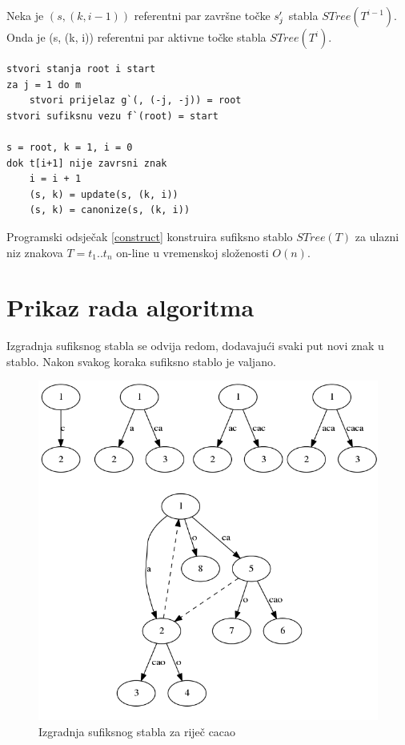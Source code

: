 \documentclass[times, utf8, seminar, numeric]{fer}
\begin{document}
\begin{lema}
Neka je $(s, (k, i-1))$ referentni par završne točke $s_j\rq{}$ stabla $STree(T^{i-1})$. Onda je (s, (k, i)) referentni par aktivne točke stabla $STree(T^i)$.
\end{lema}
			
\begin{lstlisting}[caption=Konstrukcija sufiksnog stabla, label=construct]
stvori stanja root i start
za j = 1 do m
	stvori prijelaz g`(, (-j, -j)) = root
stvori sufiksnu vezu f`(root) = start

s = root, k = 1, i = 0
dok t[i+1] nije zavrsni znak
	i = i + 1
	(s, k) = update(s, (k, i))
	(s, k) = canonize(s, (k, i))
\end{lstlisting}

Programski odsječak \ref{construct} konstruira sufiksno stablo $STree(T)$ za ulazni niz znakova $T = t_1 .. t_n$ on-line u vremenskoj složenosti $O(n)$.
						
\chapter{Prikaz rada algoritma}
Izgradnja sufiksnog stabla se odvija redom, dodavajući svaki put novi znak u stablo. Nakon svakog koraka sufiksno stablo je valjano.
\begin{figure}[h!]	
	\centering
	\includegraphics[width=1\textwidth]{media/cacao_vizualization.png}
	\caption{Izgradnja sufiksnog stabla za riječ cacao}
	\label{image:cacao}
\end{figure}
\end{document}
